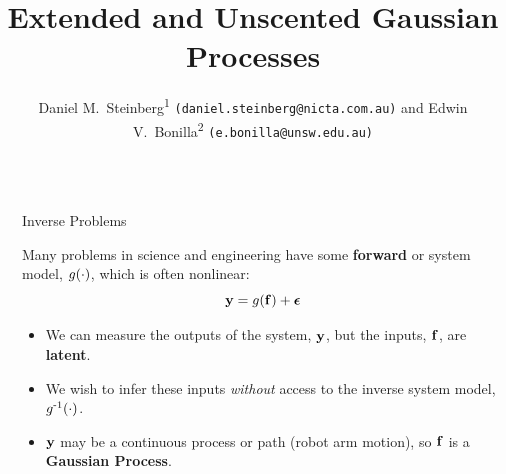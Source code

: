 \documentclass[final]{beamer}
\title{Extended and Unscented Gaussian Processes} %
\author{Daniel M.\ Steinberg\textsuperscript{1} 
        \texttt{\small(daniel.steinberg@nicta.com.au)} and
        Edwin V.\ Bonilla\textsuperscript{2}
        \texttt{\small(e.bonilla@unsw.edu.au)}} %
\institute{\textsuperscript{1}NICTA, 
           \textsuperscript{2}The University of New South Wales} %
\newlength{\sepwid}
\newlength{\onecolwid}
\begin{document}


\begin{frame}[t] %

\begin{columns}[t] %

\begin{column}{\sepwid}\end{column} %

\begin{column}{\onecolwid} %



\begin{alertblock}{Inverse Problems}

Many problems in science and engineering have some \textbf{forward} or system
model, $g\!\left({{\cdot}}\right)$, which is often nonlinear:
\begin{equation*}
    \mathbf{y} = g\!\left({{\mathbf{f}}}\right) + \boldsymbol\epsilon
\end{equation*}
\vspace{-2cm}
\begin{itemize}
    \item We can measure the outputs of the system, $\mathbf{y}$, but the inputs,
        $\mathbf{f}$, are \textbf{latent}.
    \item We wish to infer these inputs \emph{without} access to the inverse
        system model, $g^{\text{-}1}\!\left({{\cdot}}\right)$.
    \item $\mathbf{y}$ may be a continuous process or path (robot arm motion), 
        so $\mathbf{f}$ is a \textbf{Gaussian Process}.
\end{itemize}

\end{alertblock}



\end{column}
\end{columns}
\end{frame}
\end{document}

